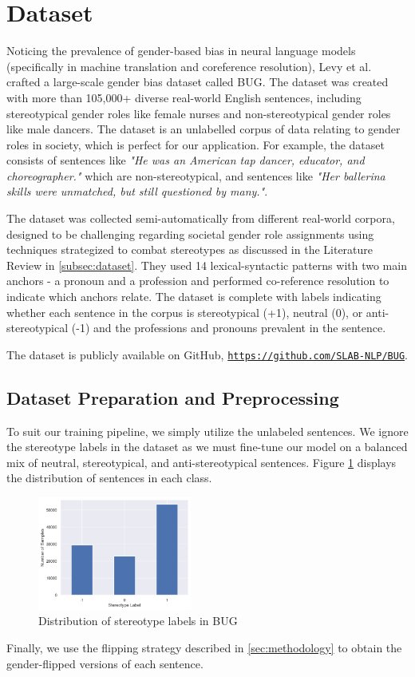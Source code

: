 \documentclass[10pt,twocolumn,letterpaper]{article}
\begin{document}
\section{Dataset}
Noticing the prevalence of gender-based bias in neural language models (specifically in machine translation and coreference resolution), Levy et al. \cite{bug-dataset} crafted a large-scale gender bias dataset called BUG.
The dataset was created with more than 105,000+ diverse real-world English sentences, including stereotypical gender roles like female nurses and non-stereotypical gender roles like male dancers.
The dataset is an unlabelled corpus of data relating to gender roles in society, which is perfect for our application.
For example, the dataset consists of sentences like \textit{"He was an American tap dancer, educator, and choreographer."} which are non-stereotypical, and sentences like \textit{"Her ballerina skills were unmatched, but still questioned by many."}.

The dataset was collected semi-automatically from different real-world corpora, designed to be challenging regarding societal gender role assignments using techniques strategized to combat stereotypes as discussed in the Literature Review in \ref{subsec:dataset}.
They used 14 lexical-syntactic patterns with two main anchors - a pronoun and a profession and performed co-reference resolution to indicate which anchors relate.
The dataset is complete with labels indicating whether each sentence in the corpus is stereotypical (+1), neutral (0), or anti-stereotypical (-1) and the professions and pronouns prevalent in the sentence.

The dataset is publicly available on GitHub, \texttt{\href{https://github.com/SLAB-NLP/BUG}{https://github.com/SLAB-NLP/BUG}}.

\subsection{Dataset Preparation and Preprocessing}
To suit our training pipeline, we simply utilize the unlabeled sentences.
We ignore the stereotype labels in the dataset as we must fine-tune our model on a balanced mix of neutral, stereotypical, and anti-stereotypical sentences.
Figure \ref{fig:distribution} displays the distribution of sentences in each class.
\begin{figure}
    \centering
    \includegraphics[width=0.45\textwidth]{Assets/distribution.png}
    \caption{Distribution of stereotype labels in BUG}
    \label{fig:distribution}
\end{figure}
Finally, we use the flipping strategy described in \ref{sec:methodology} to obtain the gender-flipped versions of each sentence.
\end{document}
